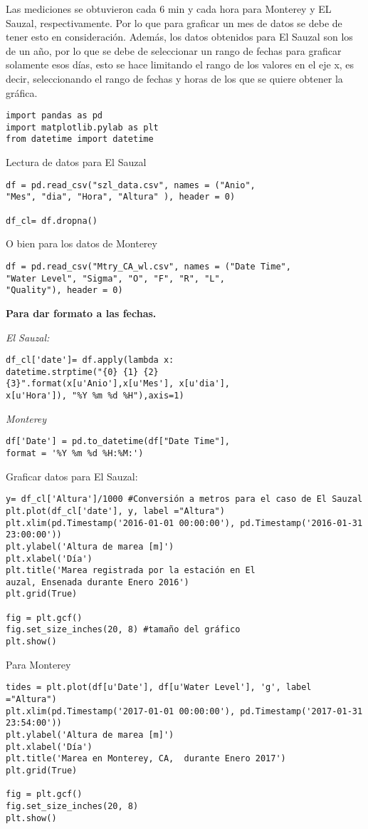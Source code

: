 Las mediciones se obtuvieron cada 6 min y cada hora para Monterey y EL Sauzal, respectivamente. Por lo que para graficar un mes de datos se debe de tener esto en consideración. Además, los datos obtenidos para El Sauzal son los de un año, por lo que se debe de seleccionar un rango de fechas para graficar solamente esos días, esto se hace limitando el rango de los valores en el eje x, es decir, seleccionando el rango de fechas y horas de los que se quiere obtener la gráfica.
\begin{verbatim}
import pandas as pd
import matplotlib.pylab as plt
from datetime import datetime
\end{verbatim}
Lectura de datos para El Sauzal
\begin{verbatim}
df = pd.read_csv("szl_data.csv", names = ("Anio",
"Mes", "dia", "Hora", "Altura" ), header = 0)

df_cl= df.dropna()
\end{verbatim}
O bien para los datos de Monterey
\begin{verbatim}
df = pd.read_csv("Mtry_CA_wl.csv", names = ("Date Time", 
"Water Level", "Sigma", "O", "F", "R", "L",
"Quality"), header = 0)
\end{verbatim}
\textbf{Para dar formato a las fechas.}

\textit{El Sauzal:}
\begin{verbatim}
df_cl['date']= df.apply(lambda x:
datetime.strptime("{0} {1} {2}
{3}".format(x[u'Anio'],x[u'Mes'], x[u'dia'],
x[u'Hora']), "%Y %m %d %H"),axis=1)
\end{verbatim}
\textit{Monterey}
\begin{verbatim}
df['Date'] = pd.to_datetime(df["Date Time"], 
format = '%Y %m %d %H:%M:')
\end{verbatim}
Graficar datos para El Sauzal:
\begin{verbatim}
y= df_cl['Altura']/1000 #Conversión a metros para el caso de El Sauzal
plt.plot(df_cl['date'], y, label ="Altura")
plt.xlim(pd.Timestamp('2016-01-01 00:00:00'), pd.Timestamp('2016-01-31 23:00:00')) 
plt.ylabel('Altura de marea [m]')
plt.xlabel('Día')
plt.title('Marea registrada por la estación en El
auzal, Ensenada durante Enero 2016')
plt.grid(True) 

fig = plt.gcf()
fig.set_size_inches(20, 8) #tamaño del gráfico
plt.show()
\end{verbatim}
Para Monterey
\begin{verbatim}
tides = plt.plot(df[u'Date'], df[u'Water Level'], 'g', label ="Altura")
plt.xlim(pd.Timestamp('2017-01-01 00:00:00'), pd.Timestamp('2017-01-31 23:54:00')) 
plt.ylabel('Altura de marea [m]')
plt.xlabel('Día')
plt.title('Marea en Monterey, CA,  durante Enero 2017')
plt.grid(True)

fig = plt.gcf()
fig.set_size_inches(20, 8)
plt.show()
\end{verbatim}

